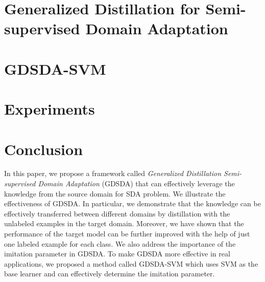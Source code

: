 \documentclass[letterpaper]{article}
\begin{document}
\section{Generalized Distillation for Semi-supervised Domain Adaptation}\label{sec:gdda}



\section{GDSDA-SVM}\label{sec:svm}


\section{Experiments}\label{sec:exp}


\section{Conclusion}\label{sec:con}
In this paper, we propose a framework called \textit{Generalized Distillation Semi-supervised Domain Adaptation} (GDSDA) that can effectively leverage the knowledge from the source domain for SDA problem. We illustrate the effectiveness of GDSDA. In particular, we demonstrate that the knowledge can be effectively transferred between different domains by distillation with the unlabeled examples in the target domain. Moreover, we have shown that the performance of the target model can be further improved with the help of just one labeled example for each class. We also address the importance of the imitation parameter in GDSDA. To make GDSDA more effective in real applications, we proposed a method called GDSDA-SVM which uses SVM as the base learner and can effectively determine the imitation parameter. 


\end{document}
